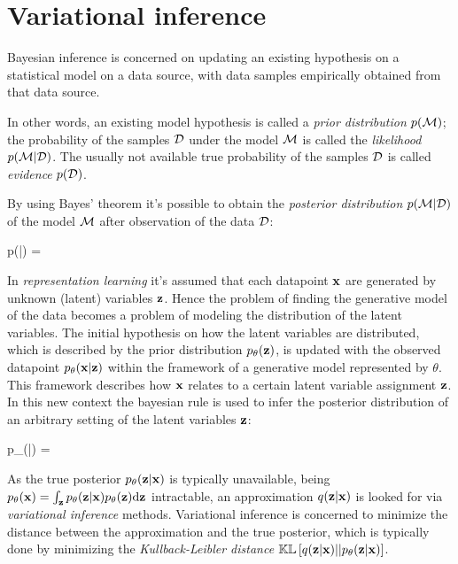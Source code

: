\section{Variational inference}

Bayesian inference is concerned on updating an existing hypothesis on a statistical model
on a data source, with data samples empirically obtained from that data source.

In other words, an existing model hypothesis is called a \emph{prior distribution} $p(\mathcal{M})$; 
the probability of the samples $\mathcal{D}$ under the model $\mathcal{M}$ is called the \emph{likelihood} $p(\mathcal{M}|\mathcal{D})$. The usually not available true probability of the samples $\mathcal{D}$ is called \emph{evidence} $p(\mathcal{D})$.

By using Bayes' theorem it's possible to obtain the \emph{posterior distribution} $p(\mathcal{M}|\mathcal{D})$ of the model $\mathcal{M}$ after observation of the data $\mathcal{D}$:

\begin{nalign}
p(\model|\dataset) = 
\end{nalign}

In \emph{representation learning} it's assumed that each datapoint $\mathbf{x}$
are generated by unknown (latent) variables $\mathbf{z}$. Hence the problem
of finding the generative model of the data becomes
a problem of modeling the distribution of the latent variables.
The initial hypothesis on how the latent variables are distributed, 
which is described by the prior distribution $p_\theta(\mathbf{z})$,
is updated with the observed datapoint $p_\theta(\mathbf{x}|\mathbf{z})$
within the framework of a generative model represented by $\theta$.
This framework describes how $\mathbf{x}$ relates to a certain latent variable assignment $\mathbf{z}$.
In this new context the bayesian rule is used to infer the posterior distribution
of an arbitrary setting of the latent variables $\mathbf{z}$:

\begin{nalign}
p_\theta(\boldz|\boldx) = 
\end{nalign}

As the true posterior $p_\theta(\mathbf{z}|\mathbf{x})$ is typically unavailable,
being $p_\theta(\mathbf{x}) = \int_{\mathbf{z}} p_\theta(\mathbf{z}|\mathbf{x})p_\theta(\mathbf{z}) \mathrm{d}\mathbf{z}$
intractable,
an approximation $q(\mathbf{z}|\mathbf{x})$ is looked for
via \emph{variational inference} methods.
Variational inference is concerned to
minimize the distance between the approximation and the true posterior\cite{Fox2012},
which is typically done by minimizing the \emph{Kullback-Leibler distance}
$\mathbb{KL}\left[ q(\mathbf{z}|\mathbf{x}) || p_\theta(\mathbf{z}|\mathbf{x}) \right]$.

